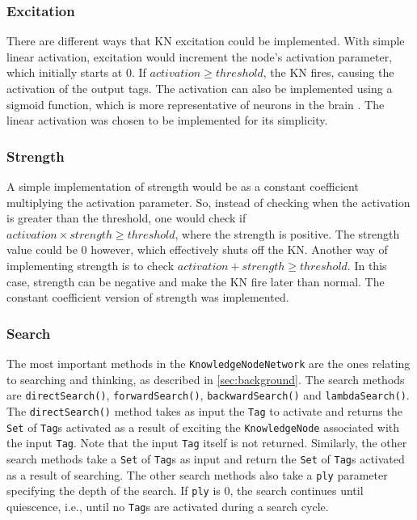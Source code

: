 \documentclass[titlepage,11pt]{article}
\newcommand{\code}[1]{\texttt{#1}}
\begin{document}
\subsubsection{Excitation}

There are different ways that KN excitation could be implemented. With simple linear activation, excitation would increment the node's activation parameter, which initially starts at 0. If $activation \geq threshold$, the KN fires, causing the activation of the output tags. The activation can also be implemented using a sigmoid function, which is more representative of neurons in the brain \cite{neuro}. The linear activation was chosen to be implemented for its simplicity.

\subsubsection{Strength}

A simple implementation of strength would be as a constant coefficient multiplying the activation parameter. So, instead of checking when the activation is greater than the threshold, one would check if $activation \times strength \geq threshold$, where the strength is positive. The strength value could be 0 however, which effectively shuts off the KN. Another way of implementing strength is to check $activation + strength \geq threshold$. In this case, strength can be negative and make the KN fire later than normal. The constant coefficient version of strength was implemented.

\subsubsection{Search}

The most important methods in the \code{KnowledgeNodeNetwork} are the ones relating to searching and thinking, as described in \cref{sec:background}. The search methods are \code{directSearch()}, \code{forwardSearch()}, \code{backwardSearch()} and \code{lambdaSearch()}. The \code{directSearch()} method takes as input the \code{Tag} to activate and returns the \code{Set} of \code{Tag}s activated as a result of exciting the \code{KnowledgeNode} associated with the input \code{Tag}. Note that the input \code{Tag} itself is not returned.
Similarly, the other search methods take a \code{Set} of \code{Tag}s as input and return the \code{Set} of \code{Tag}s activated as a result of searching. The other search methods also take a \code{ply} parameter specifying the depth of the search. If \code{ply} is 0, the search continues until quiescence, i.e., until no \code{Tag}s are activated during a search cycle.
\end{document}
